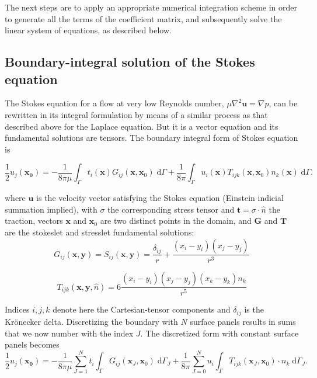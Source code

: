 \documentclass[final,leqno,]{siamltex1213}
\newcommand{\di}[1]{\text{d}#1}
\newcommand{\nhat}{\hat{n}}
\newcommand{\vect}[1]{\mathbf{#1}}
\begin{document}
The next steps are to apply an appropriate numerical integration scheme in order to generate all the terms of the coefficient matrix, and subsequently solve the linear system of equations, as described below.

\subsection{Boundary-integral solution of the Stokes equation}

The Stokes equation for a flow at very low Reynolds number, $\mu\nabla^{2}\vect{u} =  \nabla p$, can be rewritten in its integral formulation by means of a similar process as that described above for the Laplace equation. But it is a vector equation and its fundamental solutions are tensors. The boundary integral form of Stokes equation is

\begin{equation}
	\label{eqn:stokes_bem_12}
	\frac{1}{2}u_j(\vect{x_0}) = -\frac{1}{8\pi\mu}\int_{\Gamma} t_i(\vect{x})G_{ij}(\vect{x},\vect{x}_0)\;\di{\Gamma} + \frac{1}{8\pi} \int_{\Gamma} u_i(\vect{x})T_{ijk}(\vect{x},\vect{x}_0)n_k(\vect{x})\;\di{\Gamma}.
\end{equation}

\noindent where $\vect{u}$ is the velocity vector satisfying the Stokes equation (Einstein indicial summation implied), with $\sigma$ the corresponding stress tensor and $\vect{t} = \sigma\cdot\nhat$  the traction, vectors $\vect{x}$ and $\vect{x}_0$ are two distinct points in the domain, and $\vect{G}$ and $\vect{T}$ are the stokeslet and stresslet fundamental solutions:
%
\begin{equation}
	\label{eqn:stokeslet}
	G_{ij}(\vect{x},\vect{y})=S_{ij}(\vect{x},\vect{y})  =  \frac{\delta_{ij}}{r} + \frac{(x_i-y_i)(x_j-y_j)}{r^{3}} 
\end{equation}

\begin{equation}
	\label{eqn:stresslet}
	T_{ijk}(\vect{x},\vect{y},\nhat)  =  6\frac{(x_i-y_i)(x_j-y_j)(x_k-y_k)n_k}{r^{5}} \end{equation}

Indices $i, j, k$ denote here the Cartesian-tensor components and $\delta_{ij}$ is the Kr{\"o}necker delta. Discretizing the boundary with $N$ surface panels results in sums that we now number with the index $J$.
The discretized form with constant surface panels becomes
%
\begin{equation}
	\label{eqn:stokes_bem_discretized}
	\frac{1}{2}u_j(\vect{x_0}) = -\frac{1}{8\pi\mu}\sum_{J=1}^{N}t_i\int_{\Gamma} G_{ij}(\vect{x}_J, \vect{x}_0)\;\di{\Gamma_J} + \frac{1}{8\pi} \sum_{J=0}^{N}u_i\int_{\Gamma} T_{ijk}(\vect{x}_J, \vect{x}_0)\cdot n_k\;\di{\Gamma_J}.
\end{equation}
\end{document}
